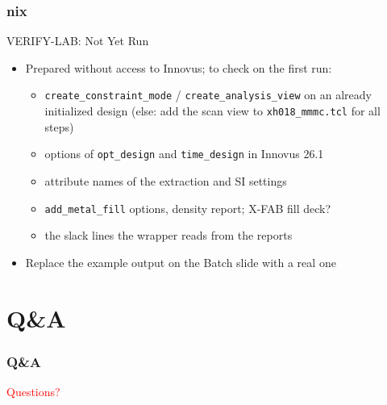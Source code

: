 \documentclass{beamer}
\newcommand{\astitle}{nix}
\newcommand{\assubtitle}{nix}
\newcommand{\cmd}[1]{\texttt{#1}}
\begin{document}
\renewcommand{\assubtitle}{VERIFY-LAB: Not Yet Run}
\begin{frame}
\frametitle{\astitle}
\begin{block}{\assubtitle}
  \footnotesize
  \begin{itemize}
    \item Prepared without access to Innovus; to check on the first run:
    \begin{itemize}
      \item \cmd{create\_constraint\_mode} / \cmd{create\_analysis\_view}
        on an already initialized design (else: add the scan view to
        \cmd{xh018\_mmmc.tcl} for all steps)
      \item options of \cmd{opt\_design} and \cmd{time\_design} in
        Innovus 26.1
      \item attribute names of the extraction and SI settings
      \item \cmd{add\_metal\_fill} options, density report; X-FAB fill deck?
      \item the slack lines the wrapper reads from the reports
    \end{itemize}
    \item Replace the example output on the Batch slide with a real one
  \end{itemize}
\end{block}
\end{frame}

\section{Q\&A}
\renewcommand{\astitle}{Q\&A}
\begin{frame}
\frametitle{\astitle}
\vfill
\centering
\begin{Huge}\textcolor{red}{Questions?}\end{Huge}
\vfill
\end{frame}
\end{document}
